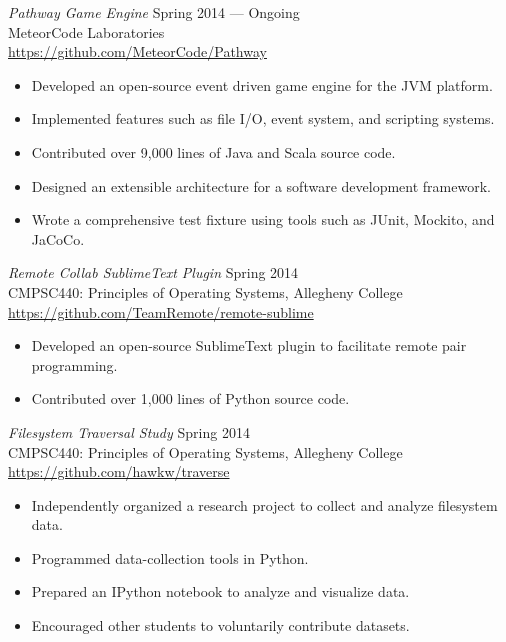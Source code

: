 \documentclass[margin]{res}
\begin{document}
\begin{resume}
        {\sl Pathway Game Engine} \hfill Spring 2014 --- Ongoing \\
                MeteorCode Laboratories \\
        \url{https://github.com/MeteorCode/Pathway}
        \begin{itemize} \itemsep -2pt %
        \item Developed an open-source event driven game engine for the JVM platform.
        \item Implemented features such as file I/O, event system, and scripting systems.
        \item Contributed over 9,000 lines of Java and Scala source code.
        \item Designed an extensible architecture for a software development framework.
        \item Wrote a comprehensive test fixture using tools such as JUnit, Mockito, and JaCoCo.
        \end{itemize}

        {\sl Remote Collab SublimeText Plugin } \hfill Spring 2014 \\
        CMPSC440: Principles of Operating Systems, Allegheny College \\
        \url{https://github.com/TeamRemote/remote-sublime}
        \begin{itemize}  \itemsep -2pt %
            \item Developed an open-source SublimeText plugin to facilitate remote pair programming.
            \item Contributed over 1,000 lines of Python source code.
        \end{itemize}

        {\sl Filesystem Traversal Study} \hfill Spring 2014 \\
        CMPSC440: Principles of Operating Systems, Allegheny College \\
        \url{https://github.com/hawkw/traverse}
         \begin{itemize} \itemsep -2pt %
            \item Independently organized a research project to collect and analyze filesystem data.
            \item Programmed data-collection tools in Python.
            \item Prepared an IPython notebook to analyze and visualize data.
            \item Encouraged other students to voluntarily contribute datasets.
        \end{itemize}



\end{resume}
\end{document}
